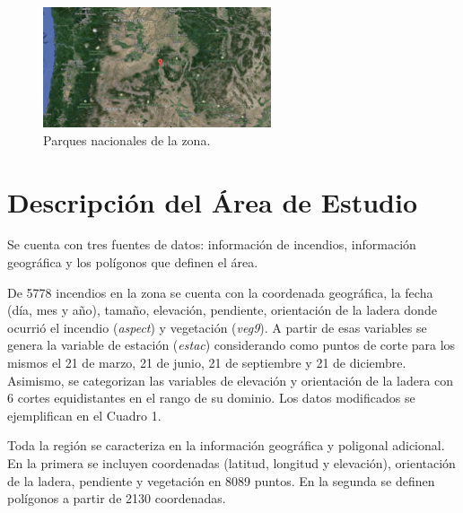 \documentclass[12,]{article}
\begin{document}
\begin{figure}[H]
\centering
\includegraphics[width=0.6\textwidth]{imagenes/blueM.png}
\caption{Parques nacionales de la zona.}

\end{figure}

\section{Descripción del Área de
Estudio}\label{descripcion-del-area-de-estudio}

Se cuenta con tres fuentes de datos: información de incendios,
información geográfica y los polígonos que definen el área.

De 5778 incendios en la zona se cuenta con la coordenada geográfica, la
fecha (día, mes y año), tamaño, elevación, pendiente, orientación de la
ladera donde ocurrió el incendio (\emph{aspect}) y vegetación
(\emph{veg9}). A partir de esas variables se genera la variable de
estación (\emph{estac}) considerando como puntos de corte para los
mismos el 21 de marzo, 21 de junio, 21 de septiembre y 21 de diciembre.
Asimismo, se categorizan las variables de elevación y orientación de la
ladera con 6 cortes equidistantes en el rango de su dominio. Los datos
modificados se ejemplifican en el Cuadro 1.

Toda la región se caracteriza en la información geográfica y poligonal
adicional. En la primera se incluyen coordenadas (latitud, longitud y
elevación), orientación de la ladera, pendiente y vegetación en 8089
puntos. En la segunda se definen polígonos a partir de 2130 coordenadas.
\end{document}
